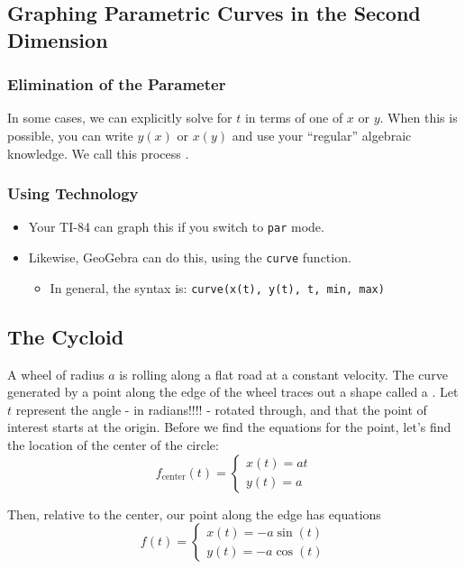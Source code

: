 \subsection{Graphing Parametric Curves in the Second Dimension}

\subsubsection{Elimination of the Parameter}

In some cases, we can explicitly solve for \(t\) in terms of one of \(x\) or \(y\). When this is possible, you can write \(y(x)\) or \(x(y)\) and use your “regular” algebraic knowledge. We call this process .

\subsubsection{Using Technology}

\begin{itemize}
    \item Your TI-84 can graph this if you switch to \texttt{par} mode.
    \item Likewise, GeoGebra can do this, using the \texttt{curve} function.
          \begin{itemize}
              \item In general, the syntax is: \texttt{curve(x(t), y(t), t, min, max)}
          \end{itemize}
\end{itemize}

\subsection{The Cycloid}
A wheel of radius \(a\) is rolling along a flat road at a constant velocity. The curve generated by a point along the edge of the wheel traces out a shape called a . Let \(t\) represent the angle - in radians!!!! - rotated through, and that the point of interest starts at the origin. Before we find the equations for the point, let's find the location of the center of the circle:
\[
    f_{\text{center}}(t) = \begin{cases}
        x(t) = a t \\
        y(t) = a
    \end{cases}
\]

Then, relative to the center, our point along the edge has equations
\[
    f(t) = \begin{cases}
        x(t) = -a \sin(t) \\
        y(t) = -a \cos(t)
    \end{cases}
\]

